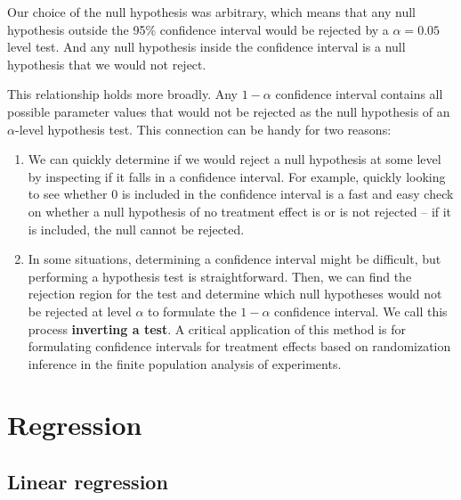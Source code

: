 \documentclass[
  letterpaper,
  DIV=11,
  numbers=noendperiod]{scrreprt}
\providecommand{\tightlist}{%
  \setlength{\itemsep}{0pt}\setlength{\parskip}{0pt}}\usepackage{longtable,booktabs,array}
\theoremstyle{definition}
\theoremstyle{definition}
\theoremstyle{plain}
\theoremstyle{remark}
\begin{document}
Our choice of the null hypothesis was arbitrary, which means that any
null hypothesis outside the 95\% confidence interval would be rejected
by a \(\alpha = 0.05\) level test. And any null hypothesis inside the
confidence interval is a null hypothesis that we would not reject.

This relationship holds more broadly. Any \(1-\alpha\) confidence
interval contains all possible parameter values that would not be
rejected as the null hypothesis of an \(\alpha\)-level hypothesis test.
This connection can be handy for two reasons:

\begin{enumerate}
\def\labelenumi{\arabic{enumi}.}
\tightlist
\item
  We can quickly determine if we would reject a null hypothesis at some
  level by inspecting if it falls in a confidence interval. For example,
  quickly looking to see whether 0 is included in the confidence
  interval is a fast and easy check on whether a null hypothesis of no
  treatment effect is or is not rejected -- if it is included, the null
  cannot be rejected.
\item
  In some situations, determining a confidence interval might be
  difficult, but performing a hypothesis test is straightforward. Then,
  we can find the rejection region for the test and determine which null
  hypotheses would not be rejected at level \(\alpha\) to formulate the
  \(1-\alpha\) confidence interval. We call this process
  \textbf{inverting a test}. A critical application of this method is
  for formulating confidence intervals for treatment effects based on
  randomization inference in the finite population analysis of
  experiments.
\end{enumerate}

\part{Regression}

\hypertarget{sec-regression}{%
\chapter{Linear regression}\label{sec-regression}}
\end{document}

